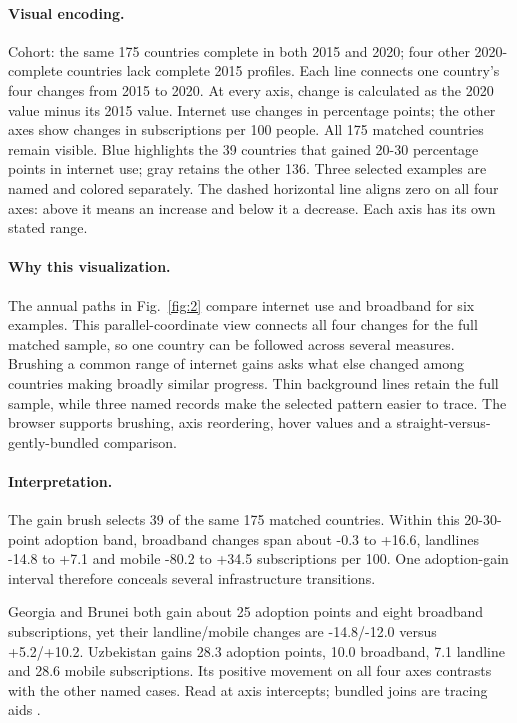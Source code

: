 \documentclass[conference,a4paper]{IEEEtran}
\begin{document}
\paragraph{Visual encoding.} Cohort: the same 175 countries complete in both 2015 and 2020; four other 2020-complete countries lack complete 2015 profiles. Each line connects one country's four changes from 2015 to 2020. At every axis, change is calculated as the 2020 value minus its 2015 value. Internet use changes in percentage points; the other axes show changes in subscriptions per 100 people. All 175 matched countries remain visible. Blue highlights the 39 countries that gained 20-30 percentage points in internet use; gray retains the other 136. Three selected examples are named and colored separately. The dashed horizontal line aligns zero on all four axes: above it means an increase and below it a decrease. Each axis has its own stated range.



\paragraph{Why this visualization.} The annual paths in Fig.~\ref{fig:2} compare internet use and broadband for six examples. This parallel-coordinate view connects all four changes for the full matched sample, so one country can be followed across several measures. Brushing a common range of internet gains asks what else changed among countries making broadly similar progress. Thin background lines retain the full sample, while three named records make the selected pattern easier to trace. The browser supports brushing, axis reordering, hover values and a straight-versus-gently-bundled comparison.



\paragraph{Interpretation.} The gain brush selects 39 of the same 175 matched countries. Within this 20-30-point adoption band, broadband changes span about -0.3 to +16.6, landlines -14.8 to +7.1 and mobile -80.2 to +34.5 subscriptions per 100. One adoption-gain interval therefore conceals several infrastructure transitions.

Georgia and Brunei both gain about 25 adoption points and eight broadband subscriptions, yet their landline/mobile changes are -14.8/-12.0 versus +5.2/+10.2. Uzbekistan gains 28.3 adoption points, 10.0 broadband, 7.1 landline and 28.6 mobile subscriptions. Its positive movement on all four axes contrasts with the other named cases. Read at axis intercepts; bundled joins are tracing aids \cite{ref10}.
\end{document}

